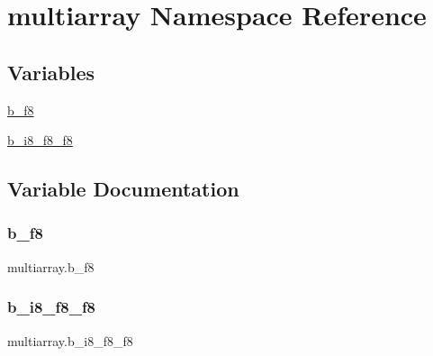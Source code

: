 \hypertarget{namespacemultiarray}{}\section{multiarray Namespace Reference}
\label{namespacemultiarray}
\subsection*{Variables}
\begin{DoxyCompactItemize}
\item 
\hyperlink{namespacemultiarray_a8c41daafe0c2a1ad2ab5fd7da4bf8ed3}{b\+\_\+f8}
\item 
\hyperlink{namespacemultiarray_ae3f48cdca41302b0207f99f129d7c8d1}{b\+\_\+i8\+\_\+f8\+\_\+f8}
\end{DoxyCompactItemize}


\subsection{Variable Documentation}
\mbox{\label{namespacemultiarray_a8c41daafe0c2a1ad2ab5fd7da4bf8ed3}} 
\subsubsection{\texorpdfstring{b\+\_\+f8}{b\_f8}}
{\footnotesize\ttfamily multiarray.\+b\+\_\+f8}

\mbox{\label{namespacemultiarray_ae3f48cdca41302b0207f99f129d7c8d1}} 
\subsubsection{\texorpdfstring{b\+\_\+i8\+\_\+f8\+\_\+f8}{b\_i8\_f8\_f8}}
{\footnotesize\ttfamily multiarray.\+b\+\_\+i8\+\_\+f8\+\_\+f8}


